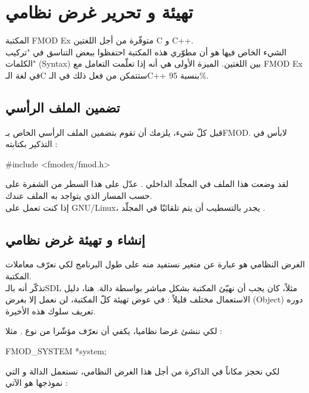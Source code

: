 \section{تهيئة و تحرير غرض نظامي}

المكتبة
\textenglish{FMOD Ex}
متوفّرة من أجل اللغتين
\textenglish{C}
و
\textenglish{C++}.\\
الشيء الخاص فيها هو أن مطوّري هذه المكتبة احتفظوا ببعض التناسق في "تركيب الكلمات"
(\textenglish{Syntax})
بين اللغتين. الميزة الأولى هي أنه إذا تعلّمت التعامل مع
\textenglish{FMOD Ex}
في لغة الـ\textenglish{C}
ستتمكن من فعل ذلك في الـ\textenglish{C++}
بنسبة 95\%.

\subsection{تضمين الملف الرأسي}

قبل كلّ شيء، يلزمك أن تقوم بتضمين الملف الرأسي الخاص بـ\textenglish{FMOD}.
 لابأس في التذكير بكتابته :

\begin{Csource}
#include <fmodex/fmod.h>
\end{Csource}

لقد وضعت هذا الملف في المجلّد الداخلي
.
عدّل على هذا السطر من الشفرة على حسب المسار الذي يتواجد به الملف عندك.\\
إذا كنت تعمل على
\mbox{\textenglish{GNU/Linux}}،
 يجدر بالتسطيب أن يتم تلقائيّا في المجلّد
.

\subsection{إنشاء و تهيئة غرض نظامي}

الغرض النظامي هو عبارة عن متغير نستفيد منه على طول البرنامج لكي نعرّف معاملات المكتبة.\\
تذكّر أنه بالـ\textenglish{SDL}
مثلاً، كان يجب أن نهيّئ المكتبة بشكل مباشر بواسطة دالة. هنا، دليل الاستعمال مختلف قليلاً : في عوض تهيئة كلّ المكتبة، لن نعمل إلا بغرض
(\textenglish{Object})
دوره تعريف سلوك هذه الأخيرة.

لكي ننشئ غرضا نظاميا، يكفي أن نعرّف مؤشّرا من نوع
.
مثلا :

\begin{Csource}
FMOD_SYSTEM *system;
\end{Csource}

لكي نحجز مكاناً في الذاكرة من أجل هذا الغرض النظامي، نستعمل الدالة
و التي نموذجها هو الآتي :

